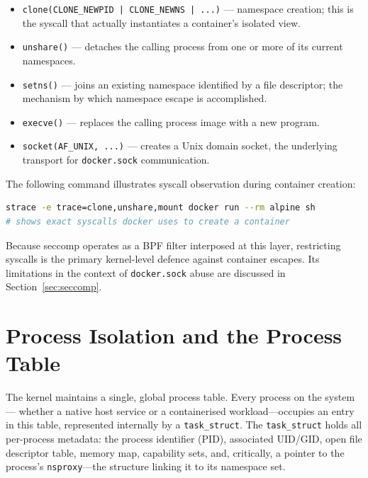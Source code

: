 \begin{itemize}
    \item \texttt{clone(CLONE\_NEWPID | CLONE\_NEWNS | ...)} --- namespace creation;
          this is the syscall that actually instantiates a container's isolated view.
    \item \texttt{unshare()} --- detaches the calling process from one or more of its
          current namespaces.
    \item \texttt{setns()} --- joins an existing namespace identified by a file
          descriptor; the mechanism by which namespace escape is accomplished.
    \item \texttt{execve()} --- replaces the calling process image with a new program.
    \item \texttt{socket(AF\_UNIX, ...)} --- creates a Unix domain socket, the
          underlying transport for \texttt{docker.sock} communication.
\end{itemize}

The following command illustrates syscall observation during container creation:

\begin{lstlisting}[language=bash]
strace -e trace=clone,unshare,mount docker run --rm alpine sh
# shows exact syscalls docker uses to create a container
\end{lstlisting}

Because seccomp operates as a BPF filter interposed at this layer, restricting
syscalls is the primary kernel-level defence against container escapes. Its
limitations in the context of \texttt{docker.sock} abuse are discussed in
Section~\ref{sec:seccomp}.


\section{Process Isolation and the Process Table}

The kernel maintains a single, global process table. Every process on the system---
whether a native host service or a containerised workload---occupies an entry in this
table, represented internally by a \texttt{task\_struct}. The \texttt{task\_struct}
holds all per-process metadata: the process identifier (PID), associated UID/GID,
open file descriptor table, memory map, capability sets, and, critically, a pointer
to the process's \texttt{nsproxy}---the structure linking it to its namespace set.

